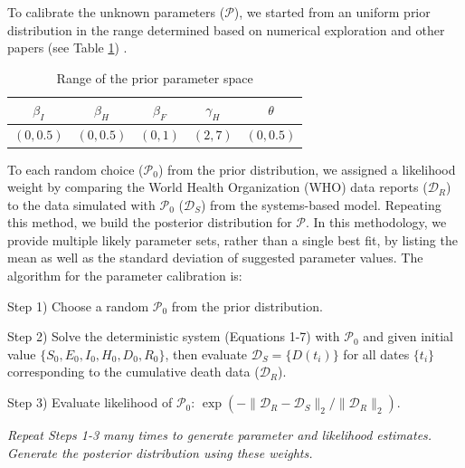 To calibrate the unknown parameters ($\mathcal{P}$), we started from an uniform prior distribution in the range determined based on numerical exploration and other papers (see Table \ref{tab:PriorRanges}) \cite{Rivers2014}. \\

\begin{table}[ht]
\centering %
\begin{tabular}{c c c c c}
\hline\hline %
$\beta_{I}$ & $\beta_{H}$ & $\beta_{F}$ & $\gamma_{H}$ & $\theta$ \\ [0.5ex]
\hline %
$(0,0.5)$ & $(0,0.5)$ & $(0,1)$ & $(2,7)$ & $(0,0.5)$ \\ [0.5ex]
\hline
\end{tabular}
\caption{Range of the prior parameter space} %
\label{tab:PriorRanges}
\end{table}


To each random choice ($\mathcal{P}_0$) from the prior distribution, we assigned a likelihood weight by comparing the World Health Organization (WHO) data reports ($\mathcal{D}_R$) to the data simulated with $\mathcal{P}_0$ ($\mathcal{D}_S$) from the systems-based model. Repeating this method, we build the posterior distribution for $\mathcal{P}$. In this methodology, we provide multiple likely parameter sets, rather than a single best fit, by listing the mean as well as the standard deviation of suggested parameter values. The algorithm for the parameter calibration is:

Step 1) Choose a random $\mathcal{P}_0$ from the prior distribution.

Step 2) Solve the deterministic system (Equations 1-7) with $\mathcal{P}_0$ and given initial value $\{S_0,E_0,I_0,H_0,D_0,R_0\}$, then evaluate $\mathcal{D}_S=\{D(t_i)\}$ for all dates $\{t_i\}$ corresponding to the cumulative death data ($\mathcal{D}_R$).

Step 3) Evaluate likelihood of $\mathcal{P}_0$: $\exp\left(-\lVert\mathcal{D}_R-\mathcal{D}_S\rVert_2/\lVert\mathcal{D}_R\rVert_2\right)$.

\emph{Repeat Steps 1-3 many times to generate {parameter and likelihood} estimates. Generate the posterior distribution using these weights.}


